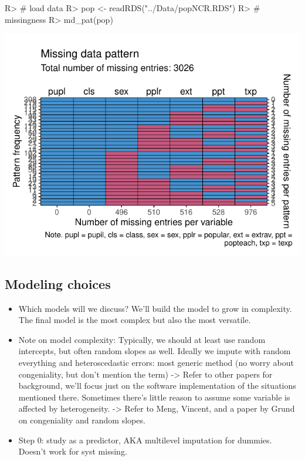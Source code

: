 \documentclass[
]{jss}
\begin{document}
\begin{CodeChunk}
\begin{CodeInput}
R> # load data
R> pop <- readRDS("../Data/popNCR.RDS")
R> # missingness
R> md_pat(pop)
\end{CodeInput}


\begin{center}\includegraphics{Manuscript_files/figure-latex/pop-1} \end{center}

\end{CodeChunk}

\hypertarget{modeling-choices}{%
\subsection{Modeling choices}\label{modeling-choices}}

\begin{itemize}
\item
  Which models will we discuss? We'll build the model to grow in
  complexity. The final model is the most complex but also the most
  versatile.
\item
  Note on model complexity: Typically, we should at least use random
  intercepts, but often random slopes as well. Ideally we impute with
  random everything and heteroscedastic errors: most generic method (no
  worry about congeniality, but don't mention the term) -\textgreater{}
  Refer to other papers for background, we'll focus just on the software
  implementation of the situations mentioned there. Sometimes there's
  little reason to assume some variable is affected by heterogeneity.
  -\textgreater{} Refer to Meng, Vincent, and a paper by Grund on
  congeniality and random slopes.
\item
  Step 0: study as a predictor, AKA multilevel imputation for dummies.
  Doesn't work for syst missing.
\end{itemize}
\end{document}
